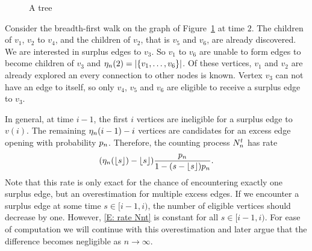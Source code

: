\begin{figure}[ht]
	
	\caption{A tree} 
	\label{F: Surplus Edges Tree}
\end{figure}

Consider the breadth-first walk on the graph of Figure~\ref{F: Surplus Edges Tree} at time $2$.
The children of $v_1$, $v_2$ to $v_4$, and the children of $v_2$, that is $v_5$ and $v_6$, are already discovered.
We are interested in surplus edges to $v_3$.
So $v_1$ to $v_6$ are unable to form edges to become children of $v_3$ and $\eta_n(2) = |\{ v_1, \dots,  v_6\}|$.
Of these vertices, $v_1$ and $v_2$ are already explored an every connection to other nodes is known.
Vertex $v_3$ can not have an edge to itself, so only $v_4$, $v_5$ and $v_6$ are eligible to receive a surplus edge to $v_3$.

In general, at time $i-1$, the first $i$ vertices are ineligible for a surplus edge to $v(i)$.
The remaining $\eta_n(i-1) - i$ vertices are candidates for an excess edge opening with probability $p_n$.
Therefore, the counting process $N_n^t$ has rate
\begin{equation} \label{E: rate Nnt}
(\eta_n(\lfloor s\rfloor) - \lfloor s\rfloor) \frac{p_n}{1-(s-\lfloor s\rfloor)p_n}.
\end{equation}
Note that this rate is only exact for the chance of encountering exactly one surplus edge, 
but an overestimation for multiple excess edges.
If we encounter a surplus edge at some time $s \in [i-1, i)$,
the number of eligible vertices should decrease by one.
However, \eqref{E: rate Nnt} is constant for all $s \in [i-1, i)$.
For ease of computation we will continue with this overestimation and later argue that the difference becomes negligible as $n \rightarrow \infty$.

